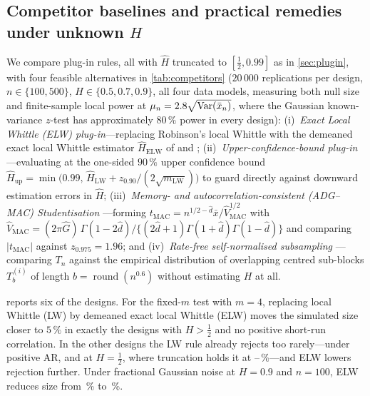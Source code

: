 \begin{table}[tbp]\centering\small
\caption{Simulated rejection percentages at nominal 5\% using local Whittle estimates of memory.}\label{tab:plugin}
%
\end{table}

\subsection{Competitor baselines and practical remedies under unknown \texorpdfstring{$H$}{H}}\label{sec:competitors}
We compare \CosCert{} plug-in rules, all with $\hat H$ truncated to $[\frac12,0.99]$ as in \cref{sec:plugin}, with four
feasible alternatives in \cref{tab:competitors} ($20\,000$ replications per design,
$n\in\{100,500\}$, $H\in\{0.5,0.7,0.9\}$, all four data models, measuring both null size and finite-sample local power
at $\mu_n=2.8\sqrt{\operatorname{Var}(\bar x_n)}$, where the Gaussian known-variance $z$-test has approximately $80\,\%$ power in every
design):
(i)~\emph{Exact Local Whittle (ELW) plug-in}---replacing Robinson's local Whittle with the demeaned exact local Whittle
estimator $\hat H_{\mathrm{ELW}}$ of \citet{SP05} and \citet{Shi10};
(ii)~\emph{Upper-confidence-bound plug-in}---evaluating \CosCert{} at the one-sided $90\,\%$ upper confidence bound
$\hat H_{\mathrm{up}}=\min\big(0.99,\,\hat H_{\mathrm{LW}}+z_{0.90}/(2\sqrt{m_{\mathrm{LW}}})\big)$ to guard directly
against downward estimation errors in $\hat H$;
(iii)~\emph{Memory- and autocorrelation-consistent (ADG--MAC) Studentisation} \citep{ADG09}---forming
$t_{\mathrm{MAC}}=n^{1/2-\hat d}\bar x/\hat V_{\mathrm{MAC}}^{1/2}$ with
$\hat V_{\mathrm{MAC}}=(2\pi\hat G)\,\Gamma(1-2\hat d)/\{(2\hat d+1)\Gamma(1+\hat d)\Gamma(1-\hat d)\}$ and
comparing $|t_{\mathrm{MAC}}|$ against $z_{0.975}=1.96$; and
(iv)~\emph{Rate-free self-normalised subsampling} \citep{PRW99,Sha10}---comparing $T_n$ against the empirical
distribution of overlapping centred sub-blocks $T_b^{(i)}$ of length $b=\operatorname{round}(n^{0.6})$ without
estimating $H$ at all.

\begin{table}[tbp]\centering\small
\caption{Simulated size and local power of feasible tests, in percent, at nominal 5\%.}\label{tab:competitors}
\footnotesize\setlength{\tabcolsep}{2.6pt}%
\end{table}

 reports six of the  designs. For the fixed-$m$ test with $m=4$, replacing
local Whittle (LW) by demeaned exact local Whittle (ELW) moves the simulated size closer to $5\,\%$ in exactly the
 designs with $H>\frac12$ and no positive short-run correlation. In the other
 designs the LW rule already rejects too rarely---under positive AR, and at $H=\frac12$, where
truncation holds it at --\,\%---and ELW lowers rejection further.
Under fractional Gaussian noise at $H=0.9$ and $n=100$, ELW reduces size from \,\% to
\,\%.

